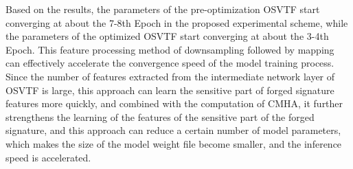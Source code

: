 Based on the results, the parameters of the pre-optimization OSVTF start converging at about the 7-8th Epoch in the proposed experimental scheme, while the parameters of the optimized OSVTF start converging at about the 3-4th Epoch. This feature processing method of downsampling followed by mapping can effectively accelerate the convergence speed of the model training process. Since the number of features extracted from the intermediate network layer of OSVTF is large, this approach can learn the sensitive part of forged signature features more quickly, and combined with the computation of CMHA, it further strengthens the learning of the features of the sensitive part of the forged signature, and this approach can reduce a certain number of model parameters, which makes the size of the model weight file become smaller, and the inference speed is accelerated.
